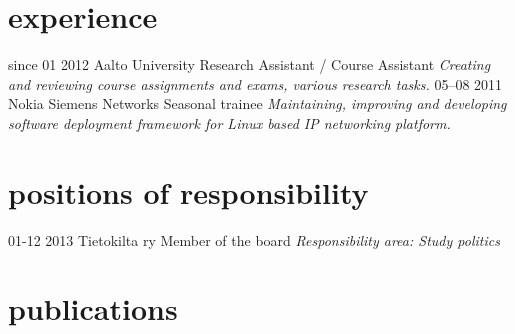 \documentclass[]{friggeri-cv}
\begin{document}
\section{experience}

\begin{entrylist}
  \entry
    {since 01 2012}
    {Aalto University}
    {Research Assistant / Course Assistant}
    {\emph{Creating and reviewing course assignments and exams, various research tasks.}}
  \entry
    {05–08 2011}
    {Nokia Siemens Networks}
    {Seasonal trainee}
    {\emph{Maintaining, improving and developing software deployment framework for Linux based IP networking platform.}}
\end{entrylist}

\section{positions of responsibility}
  \begin{entrylist}
    \entry
      {01-12 2013}
      {Tietokilta ry}
      {Member of the board}
      {\emph{Responsibility area: Study politics}}
  \end{entrylist}

\section{publications}
\end{document}
